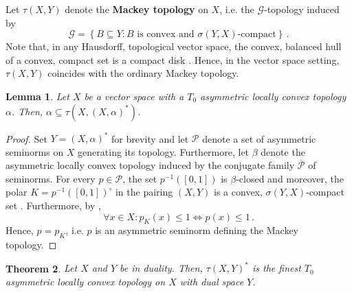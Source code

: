 \documentclass[
	paper=A4,
	pagesize=auto,
	fontsize=12pt
]{scrartcl}
\theoremstyle{plain}
\newtheorem{theorem}{Theorem}[section]
\newtheorem{lemma}[theorem]{Lemma}
\theoremstyle{remark}
\theoremstyle{definition}
\begin{document}
%
Let $\tau(X,Y)$ denote the \textbf{Mackey topology} on $X$, i.e. the $\mathcal{G}$-topology induced by
%
\begin{equation}
\mathcal{G}
=
\left\{ B \subseteq Y : B \text{ is convex and $\sigma(Y,X)$-compact} \right\} \, .
\end{equation}
%
Note that, in any Hausdorff, topological vector space, the convex, balanced hull of a convex, compact set is a compact disk \cite[p.66, 10.2]{src:SchaeferWolff:TVS}.
Hence, in the vector space setting, $\tau(X,Y)$ coincides with the ordinary Mackey topology.
%
\begin{lemma}
\label{lem:MackeyTopIsFiner}
Let $X$ be a vector space with a $T_0$ asymmetric locally convex topology $\alpha$.
Then, $\alpha \subseteq \tau(X, (X, \alpha)^*)$.
\end{lemma}
\begin{proof}
Set  $Y = (X, \alpha)^*$ for brevity and let $\mathcal{P}$ denote a set of asymmetric seminorms on $X$ generating its topology.
Furthermore, let $\beta$ denote the asymmetric locally convex topology induced by the conjugate family $\overline{\mathcal{P}}$ of seminorms.
For every $p \in \mathcal{P}$, the set $p^{-1}([0, 1] )$ is $\beta$-closed \cite[Proposition 1.1.59]{src:Cobzaş:FunctionalAnalysisinAsymmetricNormedSpaces} and moreover, the polar $K = p^{-1}([0, 1])^\circ$ in the pairing $(X, Y)$ is a convex, $\sigma(Y, X)$-compact set \cite[Theorem 2.4.30]{src:Cobzaş:FunctionalAnalysisinAsymmetricNormedSpaces}.
Furthermore, by ,
%
\begin{equation}
\forall x \in X : p_K \left( x \right) \le 1
\iff
p \left( x \right) \le 1 \, .
\end{equation}
%
Hence, $p = p_K$, i.e. $p$ is an asymmetric seminorm defining the Mackey topology.
\end{proof}
%
\begin{theorem}
Let $X$ and $Y$ be in duality.
Then, $\tau(X, Y)^*$ is the finest $T_0$ asymmetric locally convex topology on $X$ with dual space $Y$.
\end{theorem}
\end{document}
